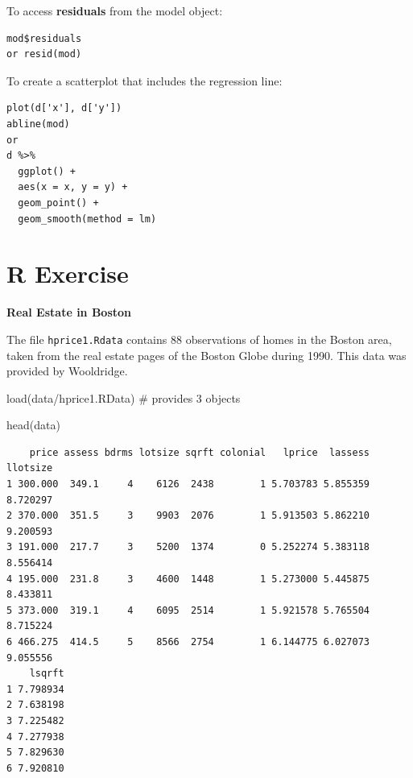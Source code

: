 \documentclass[
  letterpaper,
  DIV=11,
  numbers=noendperiod]{scrreprt}
\newenvironment{Shaded}{\begin{snugshade}}{\end{snugshade}}
\newcommand{\CommentTok}[1]{\textcolor[rgb]{0.37,0.37,0.37}{#1}}
\newcommand{\FunctionTok}[1]{\textcolor[rgb]{0.28,0.35,0.67}{#1}}
\newcommand{\NormalTok}[1]{\textcolor[rgb]{0.00,0.23,0.31}{#1}}
\newcommand{\StringTok}[1]{\textcolor[rgb]{0.13,0.47,0.30}{#1}}
\begin{document}
To access \textbf{residuals} from the model object:

\begin{verbatim}
mod$residuals
or resid(mod)
\end{verbatim}

To create a scatterplot that includes the regression line:

\begin{verbatim}
plot(d['x'], d['y'])
abline(mod)
or 
d %>% 
  ggplot() + 
  aes(x = x, y = y) + 
  geom_point() + 
  geom_smooth(method = lm)
\end{verbatim}

\section{R Exercise}\label{r-exercise}

\textbf{Real Estate in Boston}

The file \texttt{hprice1.Rdata} contains 88 observations of homes in the
Boston area, taken from the real estate pages of the Boston Globe during
1990. This data was provided by Wooldridge.

\begin{Shaded}
\begin{Highlighting}[]
\FunctionTok{load}\NormalTok{(}\StringTok{\textquotesingle{}data/hprice1.RData\textquotesingle{}}\NormalTok{) }\CommentTok{\# provides 3 objects }
\end{Highlighting}
\end{Shaded}

\begin{Shaded}
\begin{Highlighting}[]
\FunctionTok{head}\NormalTok{(data)}
\end{Highlighting}
\end{Shaded}

\begin{verbatim}
    price assess bdrms lotsize sqrft colonial   lprice  lassess llotsize
1 300.000  349.1     4    6126  2438        1 5.703783 5.855359 8.720297
2 370.000  351.5     3    9903  2076        1 5.913503 5.862210 9.200593
3 191.000  217.7     3    5200  1374        0 5.252274 5.383118 8.556414
4 195.000  231.8     3    4600  1448        1 5.273000 5.445875 8.433811
5 373.000  319.1     4    6095  2514        1 5.921578 5.765504 8.715224
6 466.275  414.5     5    8566  2754        1 6.144775 6.027073 9.055556
    lsqrft
1 7.798934
2 7.638198
3 7.225482
4 7.277938
5 7.829630
6 7.920810
\end{verbatim}
\end{document}
